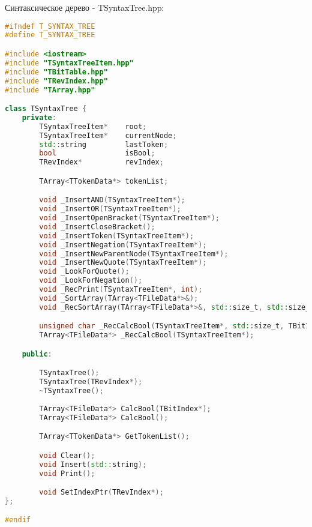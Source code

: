 Синтаксическое дерево - TSyntaxTree.hpp:
\begin{lstlisting}[language=C++]
#ifndef T_SYNTAX_TREE
#define T_SYNTAX_TREE

#include <iostream>
#include "TSyntaxTreeItem.hpp"
#include "TBitTable.hpp"
#include "TRevIndex.hpp"
#include "TArray.hpp"

class TSyntaxTree {
    private:
        TSyntaxTreeItem*    root;
        TSyntaxTreeItem*    currentNode;
        std::string         lastToken;
        bool                isBool;
        TRevIndex*          revIndex;

        TArray<TTokenData*> tokenList;

        void _InsertAND(TSyntaxTreeItem*);
        void _InsertOR(TSyntaxTreeItem*);
        void _InsertOpenBracket(TSyntaxTreeItem*);
        void _InsertCloseBracket();
        void _InsertToken(TSyntaxTreeItem*);
        void _InsertNegation(TSyntaxTreeItem*);
        void _InsertNewParentNode(TSyntaxTreeItem*);
        void _InsertNewQuote(TSyntaxTreeItem*);
        void _LookForQuote();
        void _LookForNegation();
        void _RecPrint(TSyntaxTreeItem*, int);
        void _SortArray(TArray<TFileData*>&);
        void _RecSortArray(TArray<TFileData*>&, std::size_t, std::size_t);

        unsigned char _RecCalcBool(TSyntaxTreeItem*, std::size_t, TBitIndex*);
        TArray<TFileData*> _RecCalcBool(TSyntaxTreeItem*);

    public:

        TSyntaxTree();
        TSyntaxTree(TRevIndex*);
        ~TSyntaxTree();
        
        TArray<TFileData*> CalcBool(TBitIndex*);
        TArray<TFileData*> CalcBool();

        TArray<TTokenData*> GetTokenList();

        void Clear();
        void Insert(std::string);
        void Print();

        void SetIndexPtr(TRevIndex*);
};

#endif
\end{lstlisting}

